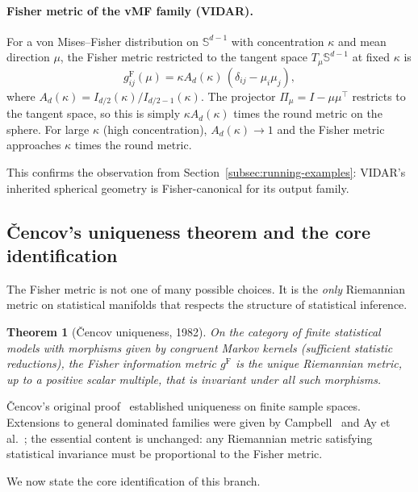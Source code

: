 \documentclass[11pt]{article}
\newcommand{\gF}{g^{\mathrm{F}}}
\newtheorem{theorem}{Theorem}
\theoremstyle{remark}
\begin{document}
\paragraph{Fisher metric of the vMF family (VIDAR).}
For a von Mises--Fisher distribution on $\mathbb{S}^{d-1}$ with concentration
$\kappa$ and mean direction $\mu$, the Fisher metric restricted to the
tangent space $T_\mu \mathbb{S}^{d-1}$ at fixed $\kappa$ is
\begin{equation}\label{eq:vmf-fisher}
\gF_{ij}(\mu) = \kappa A_d(\kappa)\,(\delta_{ij} - \mu_i \mu_j),
\end{equation}
where $A_d(\kappa) = I_{d/2}(\kappa)/I_{d/2-1}(\kappa)$.  The projector
$\Pi_\mu = I - \mu\mu^\top$ restricts to the tangent space, so this is simply
$\kappa A_d(\kappa)$ times the round metric on the sphere.  For large $\kappa$
(high concentration), $A_d(\kappa) \to 1$ and the Fisher metric approaches
$\kappa$ times the round metric.

This confirms the observation from Section~\ref{subsec:running-examples}: VIDAR's
inherited spherical geometry is Fisher-canonical for its output family.

\subsection{\v{C}encov's uniqueness theorem and the core identification}

The Fisher metric is not one of many possible choices.  It is the
\emph{only} Riemannian metric on statistical manifolds that respects the
structure of statistical inference.

\begin{theorem}[\v{C}encov uniqueness, 1982]\label{thm:cencov}
On the category of finite statistical models with morphisms given by
congruent Markov kernels (sufficient statistic reductions), the Fisher
information metric $\gF$ is the unique Riemannian metric, up to a positive
scalar multiple, that is invariant under all such morphisms.
\end{theorem}

\v{C}encov's original proof~\cite{cencov1982} established uniqueness on
finite sample spaces.  Extensions to general dominated families were given
by Campbell~\cite{campbell1986} and Ay et al.~\cite{ay2017}; the essential
content is unchanged: any Riemannian metric satisfying statistical invariance
must be proportional to the Fisher metric.

We now state the core identification of this branch.
\end{document}
